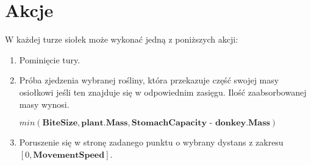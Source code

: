 \section{Akcje}
W każdej turze siołek może wykonać jedną z poniższych akcji:
\begin{enumerate}    
    \item Pominięcie tury.
    \item Próba zjedzenia wybranej rośliny, która przekazuje część swojej masy osiołkowi jeśli ten znajduje się w odpowiednim zasięgu. Ilość zaabsorbowanej masy wynosi.
    
    $min(\textbf{BiteSize}, \textbf{plant.Mass}, \textbf{StomachCapacity - donkey.Mass})$
    \item Poruszenie się w stronę zadanego punktu o wybrany dystans z zakresu $[0,\textbf{MovementSpeed}]$.
\end{enumerate}



